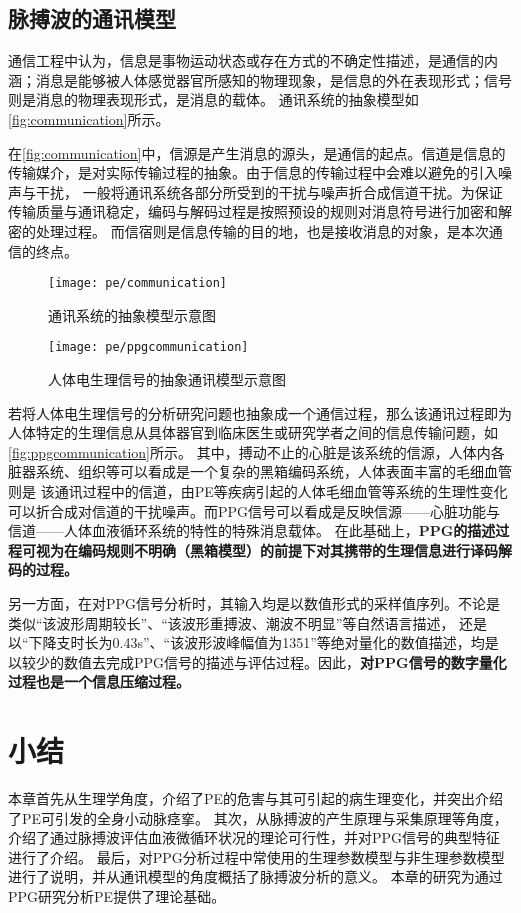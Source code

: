 \subsection{脉搏波的通讯模型}
通信工程中认为，信息是事物运动状态或存在方式的不确定性描述，是通信的内涵；消息是能够被人体感觉器官所感知的物理现象，是信息的外在表现形式；信号则是消息的物理表现形式，是消息的载体\cite{Shannon1948,Liu2019,Zhao2017}。
通讯系统的抽象模型如\autoref{fig:communication}所示。

在\autoref{fig:communication}中，信源是产生消息的源头，是通信的起点。信道是信息的传输媒介，是对实际传输过程的抽象。由于信息的传输过程中会难以避免的引入噪声与干扰，
一般将通讯系统各部分所受到的干扰与噪声折合成信道干扰。为保证传输质量与通讯稳定，编码与解码过程是按照预设的规则对消息符号进行加密和解密的处理过程。
而信宿则是信息传输的目的地，也是接收消息的对象，是本次通信的终点\cite{Zhao2017}。

\begin{figure}[htbp]
    \centering
    \texttt{[image: pe/communication]}
    \caption[通讯系统的抽象模型示意图]{\label{fig:communication}通讯系统的抽象模型示意图\cite{Zhao2017,Liu2019}}
\end{figure}

\begin{figure}[htbp]
    \centering
    \texttt{[image: pe/ppgcommunication]}
    \caption{\label{fig:ppgcommunication}人体电生理信号的抽象通讯模型示意图}
\end{figure}

若将人体电生理信号的分析研究问题也抽象成一个通信过程，那么该通讯过程即为人体特定的生理信息从具体器官到临床医生或研究学者之间的信息传输问题，如\autoref{fig:ppgcommunication}所示。
其中，搏动不止的心脏是该系统的信源，人体内各脏器系统、组织等可以看成是一个复杂的黑箱编码系统，人体表面丰富的毛细血管则是
该通讯过程中的信道，由PE等疾病引起的人体毛细血管等系统的生理性变化可以折合成对信道的干扰噪声。而PPG信号可以看成是反映信源——心脏功能与信道——人体血液循环系统的特性的特殊消息载体。
在此基础上，\textbf{PPG的描述过程可视为在编码规则不明确（黑箱模型）的前提下对其携带的生理信息进行译码解码的过程。}

另一方面，在对PPG信号分析时，其输入均是以数值形式的采样值序列。不论是类似“该波形周期较长”、“该波形重搏波、潮波不明显”等自然语言描述，
还是以“下降支时长为0.43s”、“该波形波峰幅值为1351”等绝对量化的数值描述，均是以较少的数值去完成PPG信号的描述与评估过程。因此，\textbf{对PPG信号的数字量化过程也是一个信息压缩过程。}

\section{小结}
本章首先从生理学角度，介绍了PE的危害与其可引起的病生理变化，并突出介绍了PE可引发的全身小动脉痉挛。
其次，从脉搏波的产生原理与采集原理等角度，介绍了通过脉搏波评估血液微循环状况的理论可行性，并对PPG信号的典型特征进行了介绍。
最后，对PPG分析过程中常使用的生理参数模型与非生理参数模型进行了说明，并从通讯模型的角度概括了脉搏波分析的意义。
本章的研究为通过PPG研究分析PE提供了理论基础。